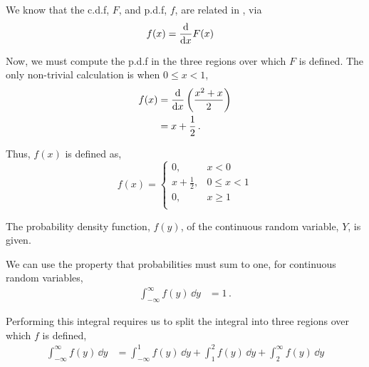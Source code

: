 \begin{subquestions}
\begin{subsubquestions}

\subsubquestion

We know that the c.d.f, $F$, and p.d.f, $f$, are related in , via
\begin{align}
	f(x) & = \frac{\mathrm{d}}{\mathrm{d}x} F(x)
\end{align}

Now, we must compute the p.d.f in the three regions over which $F$ is defined. The only non-trivial calculation is when $0 \leq x < 1$,
\begin{align}
f(x)  & = \frac{\mathrm{d}}{\mathrm{d}x}\left(\frac{x^2+x}{2} \right) \nonumber \\
	   & = x + \frac{1}{2} \,.
\end{align}

Thus, $f(x)$ is defined as,
\begin{equation}
f(x) = 
\begin{cases}
	0, & x<0 \\
	x + \frac{1}{2}, & 0 \leq  x < 1 \\
	0, & x \geq 1 \\
\end{cases}
\end{equation}

\end{subsubquestions}	
	

\subquestion

The probability density function, $f(y)$, of the continuous random variable, $Y$, is given.

\begin{subsubquestions}
	
\subsubquestion

We can use the property that probabilities must sum to one,  for continuous random variables,
\begin{align}
	\int_{-\infty}^{\infty} f(y)\, \dd y & = 1 \,.
\end{align}

Performing this integral requires us to split the integral into three regions over which $f$ is defined,
\begin{align}
\int_{-\infty}^{\infty} f(y)\, \dd y & = \int_{-\infty}^{1} f(y)\, \dd y + \int_{1}^{2} f(y)\, \dd y + \int_{2}^{\infty} f(y)\, \dd y
\end{align}


\end{subsubquestions}
\end{subquestions}
